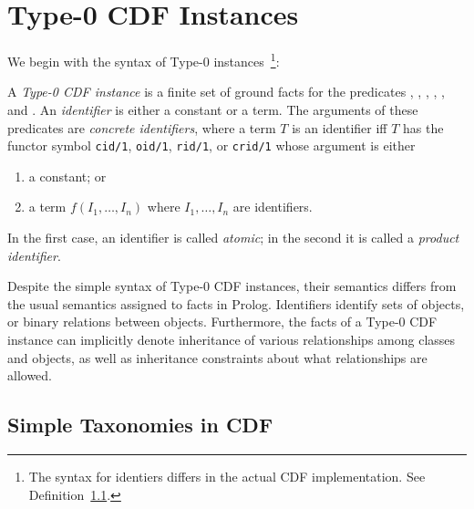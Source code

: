 \section{Type-0 CDF Instances}

We begin with the syntax of Type-0 instances~\footnote{The syntax for
identiers differs in the actual CDF implementation. See Definition~\ref{}.}:

\begin{definition} \label{def:ids}
A {\em Type-0 CDF instance} is a finite set of ground facts for the
predicates , , ,
, , and .  An {\em
identifier} is either a constant or a term.  The arguments of these
predicates are {\em concrete identifiers}, where a term $T$ is an
identifier iff $T$ has the functor symbol {\tt cid/1}, {\tt oid/1},
{\tt rid/1}, or {\tt crid/1} whose argument is either

\begin{enumerate}
\item a constant; or 
\item a term $f(I_1,\ldots,I_n)$ where $I_1,\ldots,I_n$ are identifiers.
\end{enumerate}
In the first case, an identifier is called {\em atomic}; in the second
it is called a {\em product identifier}.
\end{definition}

Despite the simple syntax of Type-0 CDF instances, their semantics
differs from the usual semantics assigned to facts in Prolog.
Identifiers identify sets of objects, or binary relations between
objects.  Furthermore, the facts of a Type-0 CDF instance can
implicitly denote inheritance of various relationships among classes
and objects, as well as inheritance constraints about what
relationships are allowed.

\subsection{Simple Taxonomies in CDF}

